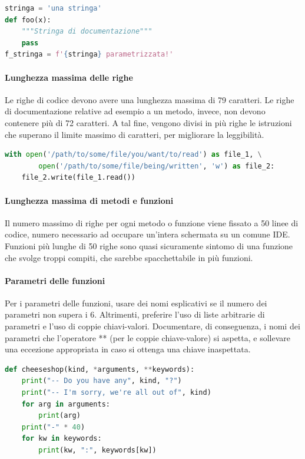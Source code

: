 \begin{lstlisting}[language=Python]
stringa = 'una stringa'
def foo(x):
	"""Stringa di documentazione"""
	pass
f_stringa = f'{stringa} parametrizzata!'
\end{lstlisting}

        \paragraph{Lunghezza massima delle righe}
		Le righe di codice devono avere una lunghezza massima di 79 caratteri. Le righe di documentazione relative ad esempio a un metodo,
		invece, non devono contenere più di 72 caratteri.
		A tal fine, vengono divisi in più righe le istruzioni che superano il limite massimo di caratteri, per migliorare la leggibilità.

		\begin{lstlisting}[language=Python]
with open('/path/to/some/file/you/want/to/read') as file_1, \
        open('/path/to/some/file/being/written', 'w') as file_2:
	file_2.write(file_1.read())
		\end{lstlisting}


		\paragraph{Lunghezza massima di metodi e funzioni}
		Il numero massimo di righe per ogni metodo o funzione viene fissato a 50 linee di codice, numero necessario ad occupare un'intera
		schermata su un comune IDE. Funzioni più lunghe di 50 righe sono quasi sicuramente sintomo di una funzione che svolge troppi compiti,
		che sarebbe spacchettabile in più funzioni.

		\paragraph{Parametri delle funzioni}
		Per i parametri delle funzioni, usare dei nomi esplicativi se il numero dei parametri non supera i 6. Altrimenti, preferire l'uso di liste
		arbitrarie di parametri e l'uso di coppie chiavi-valori. Documentare, di conseguenza,
		i nomi dei parametri che l'operatore ** (per le coppie chiave-valore) si aspetta, e sollevare una eccezione appropriata in caso si ottenga una chiave
		inaspettata.
\begin{lstlisting}[language=Python]
def cheeseshop(kind, *arguments, **keywords):
    print("-- Do you have any", kind, "?")
    print("-- I'm sorry, we're all out of", kind)
    for arg in arguments:
        print(arg)
    print("-" * 40)
    for kw in keywords:
        print(kw, ":", keywords[kw])
\end{lstlisting}

